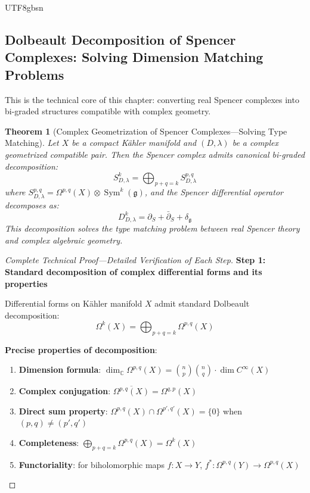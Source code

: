 \documentclass[a4paper,12pt]{extarticle}
\newtheorem{theorem}{Theorem}[section]
\theoremstyle{definition}
\begin{document}
\begin{CJK}{UTF8}{gbsn}
\subsection{Dolbeault Decomposition of Spencer Complexes: Solving Dimension Matching Problems}
\label{subsec:spencer_dolbeault_essential}

This is the technical core of this chapter: converting real Spencer complexes into bi-graded structures compatible with complex geometry.

\begin{theorem}[Complex Geometrization of Spencer Complexes—Solving Type Matching]
\label{thm:spencer_complex_dolbeault_resolution}
Let $X$ be a compact Kähler manifold and $(D,\lambda)$ be a complex geometrized compatible pair. Then the Spencer complex admits canonical bi-graded decomposition:
\begin{equation}
\label{eq:spencer_dolbeault_master}
S^k_{D,\lambda} = \bigoplus_{p+q=k} S^{p,q}_{D,\lambda}
\end{equation}
where $S^{p,q}_{D,\lambda} = \Omega^{p,q}(X) \otimes \operatorname{Sym}^k(\mathfrak{g})$, and the Spencer differential operator decomposes as:
\begin{equation}
\label{eq:spencer_differential_dolbeault}
D^k_{D,\lambda} = \partial_S + \bar{\partial}_S + \delta_{\mathfrak{g}}
\end{equation}
This decomposition solves the type matching problem between real Spencer theory and complex algebraic geometry.
\end{theorem}

\begin{proof}[Complete Technical Proof—Detailed Verification of Each Step]
\textbf{Step 1: Standard decomposition of complex differential forms and its properties}

Differential forms on Kähler manifold $X$ admit standard Dolbeault decomposition:
$$\Omega^k(X) = \bigoplus_{p+q=k} \Omega^{p,q}(X)$$

\textbf{Precise properties of decomposition}:
\begin{enumerate}
    \item \textbf{Dimension formula}: $\dim_{\mathbb{C}} \Omega^{p,q}(X) = \binom{n}{p}\binom{n}{q} \cdot \dim C^\infty(X)$
    \item \textbf{Complex conjugation}: $\overline{\Omega^{p,q}(X)} = \Omega^{q,p}(X)$
    \item \textbf{Direct sum property}: $\Omega^{p,q}(X) \cap \Omega^{p',q'}(X) = \{0\}$ when $(p,q) \neq (p',q')$
    \item \textbf{Completeness}: $\bigoplus_{p+q=k} \Omega^{p,q}(X) = \Omega^k(X)$
    \item \textbf{Functoriality}: for biholomorphic maps $f: X \to Y$, $f^*: \Omega^{p,q}(Y) \to \Omega^{p,q}(X)$
\end{enumerate}


\end{proof}
\end{CJK}
\end{document}
